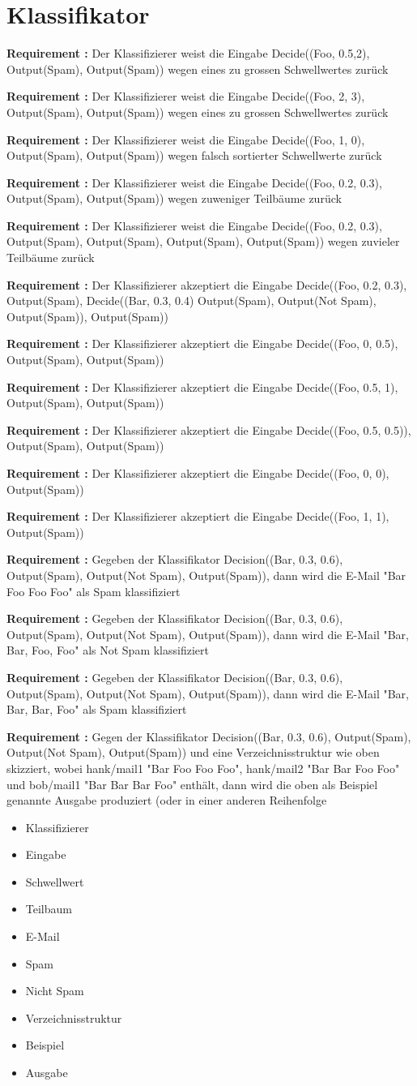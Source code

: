 \documentclass{article}
\newcounter{requirementscount}{}
\newcommand{\requirement}[1] {
        \addtocounter{requirementscount}{1}
        {\bf Requirement \therequirementscount:} #1\\
    }
\begin{document}
\section{Klassifikator}
\requirement{Der Klassifizierer weist die Eingabe Decide((Foo, 0.5,2),
Output(Spam), Output(Spam)) wegen eines zu grossen Schwellwertes zur\"uck}
\requirement{Der Klassifizierer weist die Eingabe Decide((Foo, 2, 3),
Output(Spam), Output(Spam)) wegen eines zu grossen Schwellwertes zur\"uck}
\requirement{Der Klassifizierer weist die Eingabe Decide((Foo, 1, 0),
Output(Spam), Output(Spam)) wegen falsch sortierter Schwellwerte zur\"uck}
\requirement{Der Klassifizierer weist die Eingabe Decide((Foo, 0.2, 0.3),
Output(Spam), Output(Spam)) wegen zuweniger Teilb\"aume zur\"uck}
\requirement{Der Klassifizierer weist die Eingabe Decide((Foo, 0.2, 0.3),
Output(Spam), Output(Spam), Output(Spam), Output(Spam)) wegen zuvieler
Teilb\"aume zur\"uck}
\requirement{Der Klassifizierer akzeptiert die Eingabe 
Decide((Foo, 0.2, 0.3), 
    Output(Spam),
    Decide((Bar, 0.3, 0.4)
        Output(Spam),
        Output(Not Spam), 
        Output(Spam)),
    Output(Spam))}
\requirement{Der Klassifizierer akzeptiert die Eingabe Decide((Foo, 0, 0.5),
Output(Spam), Output(Spam))}
\requirement{Der Klassifizierer akzeptiert die Eingabe Decide((Foo, 0.5, 1),
Output(Spam), Output(Spam))}
\requirement{Der Klassifizierer akzeptiert die Eingabe 
Decide((Foo, 0.5, 0.5)), Output(Spam), Output(Spam))}
\requirement{Der Klassifizierer akzeptiert die Eingabe Decide((Foo, 0, 0),
Output(Spam))}
\requirement{Der Klassifizierer akzeptiert die Eingabe Decide((Foo, 1, 1),
Output(Spam))}
\requirement{Gegeben der Klassifikator Decision((Bar, 0.3, 0.6), Output(Spam),
Output(Not Spam), Output(Spam)), dann wird die E-Mail "Bar Foo Foo Foo" als
Spam klassifiziert}
\requirement{Gegeben der Klassifikator Decision((Bar, 0.3, 0.6), Output(Spam),
Output(Not Spam), Output(Spam)), dann wird die E-Mail "Bar, Bar, Foo, Foo" als
Not Spam klassifiziert}
\requirement{Gegeben der Klassifikator Decision((Bar, 0.3, 0.6), Output(Spam),
Output(Not Spam), Output(Spam)), dann wird die E-Mail "Bar, Bar, Bar, Foo" als
Spam klassifiziert}
\requirement{Gegen der Klassifikator Decision((Bar, 0.3, 0.6), Output(Spam),
Output(Not Spam), Output(Spam)) und eine Verzeichnisstruktur wie oben
skizziert, wobei hank/mail1 "Bar Foo Foo Foo", hank/mail2 "Bar Bar Foo Foo"
und bob/mail1 "Bar Bar Bar Foo" enth\"alt, dann wird die oben als Beispiel
genannte Ausgabe produziert (oder in einer anderen Reihenfolge}

\pagebreak
\begin{multicols}{2}
\begin{itemize}
\item Klassifizierer
\item Eingabe
\item Schwellwert
\item Teilbaum
\item E-Mail
\item Spam
\item Nicht Spam
\item Verzeichnisstruktur
\item Beispiel
\item Ausgabe
\end{itemize}
\end{multicols}
\end{document}

